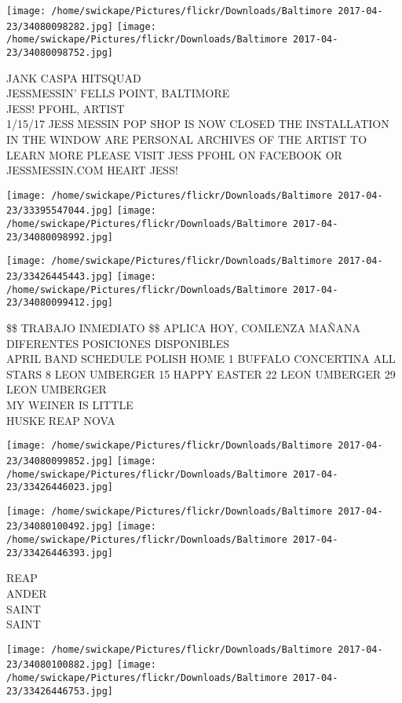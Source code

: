 \documentclass[10pt,letterpaper]{article}
\begin{document}
\texttt{[image: /home/swickape/Pictures/flickr/Downloads/Baltimore 2017-04-23/34080098282.jpg]}
\texttt{[image: /home/swickape/Pictures/flickr/Downloads/Baltimore 2017-04-23/34080098752.jpg]}

JANK CASPA HITSQUAD\\
JESSMESSIN' FELLS POINT, BALTIMORE\\
JESS! PFOHL, ARTIST\\
1/15/17 JESS MESSIN POP SHOP IS NOW CLOSED THE INSTALLATION IN THE WINDOW ARE PERSONAL ARCHIVES OF THE ARTIST TO LEARN MORE PLEASE VISIT JESS PFOHL ON FACEBOOK OR JESSMESSIN.COM HEART JESS!\\
\pagebreak

\texttt{[image: /home/swickape/Pictures/flickr/Downloads/Baltimore 2017-04-23/33395547044.jpg]}
\texttt{[image: /home/swickape/Pictures/flickr/Downloads/Baltimore 2017-04-23/34080098992.jpg]}

\texttt{[image: /home/swickape/Pictures/flickr/Downloads/Baltimore 2017-04-23/33426445443.jpg]}
\texttt{[image: /home/swickape/Pictures/flickr/Downloads/Baltimore 2017-04-23/34080099412.jpg]}

\$\$ TRABAJO INMEDIATO \$\$ APLICA HOY, COMLENZA MAÑANA DIFERENTES POSICIONES DISPONIBLES\\
APRIL BAND SCHEDULE POLISH HOME 1 BUFFALO CONCERTINA ALL STARS 8 LEON UMBERGER 15 HAPPY EASTER 22 LEON UMBERGER 29 LEON UMBERGER\\
MY WEINER IS LITTLE\\
HUSKE REAP NOVA\\
\pagebreak

\texttt{[image: /home/swickape/Pictures/flickr/Downloads/Baltimore 2017-04-23/34080099852.jpg]}
\texttt{[image: /home/swickape/Pictures/flickr/Downloads/Baltimore 2017-04-23/33426446023.jpg]}

\texttt{[image: /home/swickape/Pictures/flickr/Downloads/Baltimore 2017-04-23/34080100492.jpg]}
\texttt{[image: /home/swickape/Pictures/flickr/Downloads/Baltimore 2017-04-23/33426446393.jpg]}

REAP\\
ANDER\\
SAINT\\
SAINT\\
\pagebreak

\texttt{[image: /home/swickape/Pictures/flickr/Downloads/Baltimore 2017-04-23/34080100882.jpg]}
\texttt{[image: /home/swickape/Pictures/flickr/Downloads/Baltimore 2017-04-23/33426446753.jpg]}
\end{document}
